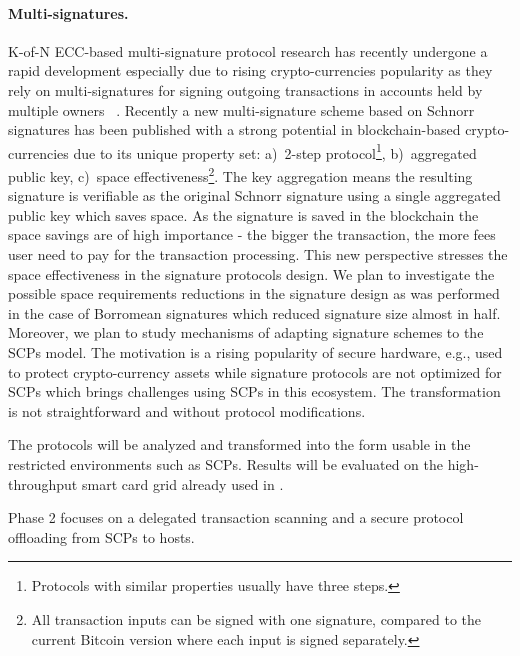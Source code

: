 \documentclass[
  digital, %
  twoside, %
  table,   %
  lof,     %
  lot,     %
]{fithesis3}
\begin{document}
\begin{ecmmnt}
\paragraph{Multi-signatures.} K-of-N ECC-based multi-signature protocol research has recently undergone a rapid development especially due to rising crypto-currencies popularity as they rely on multi-signatures for signing outgoing transactions in accounts held by multiple owners ~\cite{Bellare:2006:MPP:1180405.1180453, Bellare:2007:UAS:2394539.2394589, 10.1007/3-540-36288-6_3, cryptoeprint:2015:996, Bnz2017BulletproofsSP, cryptoeprint:2018:068}.
Recently a new multi-signature scheme \cite{cryptoeprint:2018:068} based on Schnorr signatures \cite{schnor-10.1007/3-540-46885-4_68} has been published with a strong potential in blockchain-based crypto-currencies due to its unique property set: 
a)~2-step protocol\footnote{Protocols with similar properties usually have three steps.}, b)~aggregated public key, c)~space effectiveness\footnote{All transaction inputs can be signed with one signature, compared to the current Bitcoin version where each input is signed separately.}. 
The key aggregation means the resulting signature is verifiable as the original Schnorr signature using a single aggregated public key which saves space. As the signature is saved in the blockchain the space savings are of high importance - the bigger the transaction, the more fees user need to pay for the transaction processing. This new perspective stresses the space effectiveness in the signature protocols design. We plan to investigate the possible space requirements reductions in the signature design as was performed in the case of Borromean signatures \cite{borromean} which reduced signature size almost in half. Moreover, we plan to study mechanisms of adapting signature schemes to the SCPs model. The motivation is a rising popularity of secure hardware, e.g., used to protect crypto-currency assets while signature protocols are not optimized for SCPs which brings challenges using SCPs in this ecosystem. The transformation is not straightforward and without protocol modifications.


The protocols will be analyzed and transformed into the form usable in the restricted environments such as SCPs. Results will be evaluated on the high-throughput smart card grid already used in \cite{2017-ccs-mavroudis}. 


Phase 2 focuses on a delegated transaction scanning and a secure protocol offloading from SCPs to hosts.
 

\end{ecmmnt}
\end{document}
